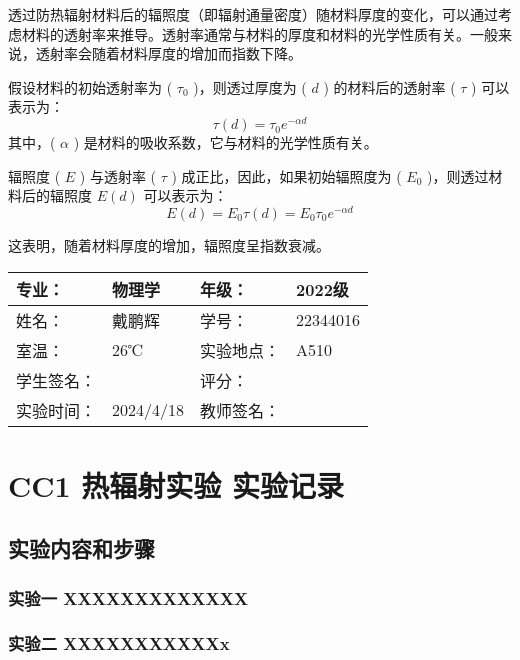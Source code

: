 \documentclass[dvipsnames, svgnames,a4paper,11pt]{article}
\begin{document}
	透过防热辐射材料后的辐照度（即辐射通量密度）随材料厚度的变化，可以通过考虑材料的透射率来推导。透射率通常与材料的厚度和材料的光学性质有关。一般来说，透射率会随着材料厚度的增加而指数下降。
	
	假设材料的初始透射率为 ( $\tau_0$ )，则透过厚度为 ( $d$ ) 的材料后的透射率 ( $\tau$ ) 可以表示为：
	\[
		\tau(d)=\tau_0e^{-\alpha d}
	\]
	其中，( $\alpha$ ) 是材料的吸收系数，它与材料的光学性质有关。
	
	辐照度 ( $E$ ) 与透射率 ( $\tau$ ) 成正比，因此，如果初始辐照度为 ( $E_0$ )，则透过材料后的辐照度  $E(d)$  可以表示为：
	\[
		E(d)=E_0\tau(d)=E_0\tau_0 e^{-\alpha d}
	\]
	
	这表明，随着材料厚度的增加，辐照度呈指数衰减。






\clearpage
\begin{table}
	\renewcommand\arraystretch{1.7}
	\centering
	\begin{tabularx}{\textwidth}{|X|X|X|X|}
	\hline
	专业：& 物理学 &年级：& 2022级 \\
	\hline
	姓名：& 戴鹏辉 & 学号：& 22344016 \\
	\hline
	室温：& 26℃ & 实验地点： & A510 \\
	\hline
	学生签名：& & 评分： &\\
	\hline
	实验时间：& 2024/4/18 & 教师签名：&\\
	\hline
	\end{tabularx}
\end{table}

\section{CC1 \quad 热辐射实验 \quad\heiti 实验记录}
\subsection{实验内容和步骤}

	\subsubsection{实验一 \quad XXXXXXXXXXXXX}
	




	\subsubsection{实验二 \quad XXXXXXXXXXXx}
\end{document}
